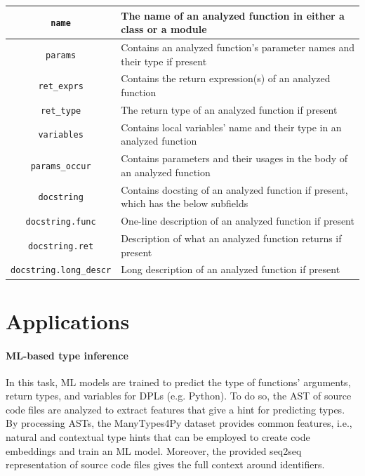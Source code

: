 \documentclass[10pt, conference]{IEEEtran}
\begin{document}
\begin{table}[!t]
\begin{tabular}{c l}
		\midrule
		\texttt{name} & The name of an analyzed function in either a class or a module \\
		\midrule
		\texttt{params} & Contains an analyzed function's parameter names and their type if present \\
		\midrule
		\texttt{ret\_exprs} & Contains the return expression(s) of an analyzed function \\
		\midrule
		\texttt{ret\_type} & The return type of an analyzed function if present \\
		\midrule
		\texttt{variables} & Contains local variables' name and their type in an analyzed function \\
		\midrule
		\texttt{params\_occur} & Contains parameters and their usages in the body of an analyzed function \\
		\midrule
		\texttt{docstring} & Contains docsting of an analyzed function if present, which has the below subfields \\
		\midrule
		\texttt{docstring.func} & One-line description of an analyzed function if present \\
		\midrule
		\texttt{docstring.ret} & Description of what an analyzed function returns if present \\
		\midrule
		\texttt{docstring.long\_descr} & Long description of an analyzed function if present \\
		\bottomrule
	\end{tabular}
\end{table}

\section{Applications}
\paragraph{\textbf{ML-based type inference}} In this task, ML models are trained to predict the type of functions' arguments, return types, and variables for DPLs (e.g. Python). To do so, the AST of source code files are analyzed to extract features that give a hint for predicting types. By processing ASTs, the ManyTypes4Py dataset provides common features, i.e., natural and contextual type hints that can be employed to create code embeddings and train an ML model. Moreover, the provided seq2seq representation of source code files gives the full context around identifiers.

\end{document}
